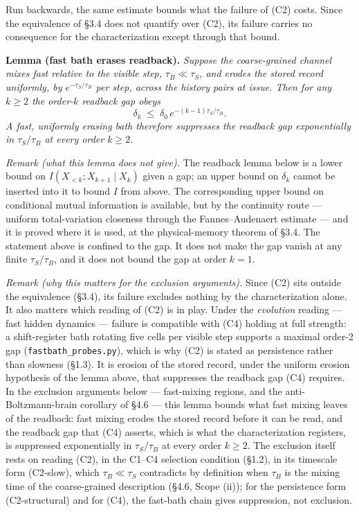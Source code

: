 \documentclass[
]{article}
\begin{document}
Run backwards, the same estimate bounds what the failure of (C2) costs.
Since the equivalence of §3.4 does not quantify over (C2), its failure
carries no consequence for the characterization except through that
bound.

\textbf{Lemma (fast bath erases readback).} \emph{Suppose the
coarse-grained channel mixes fast relative to the visible step,
\(\tau_B \ll \tau_S\), and erodes the stored record uniformly, by
\(e^{-\tau_S/\tau_B}\) per step, across the history pairs at issue. Then
for any \(k \geq 2\) the order-\(k\) readback gap obeys}
\[\delta_k \;\leq\; \delta_0\, e^{-(k-1)\tau_S/\tau_B}.\] \emph{A fast,
uniformly erasing bath therefore suppresses the readback gap
exponentially in \(\tau_S/\tau_B\) at every order \(k \geq 2\).}

\emph{Remark (what this lemma does not give).} The readback lemma below
is a lower bound on \(I(X_{<k}; X_{k+1} \mid X_k)\) given a gap; an
upper bound on \(\delta_k\) cannot be inserted into it to bound \(I\)
from above. The corresponding upper bound on conditional mutual
information is available, but by the continuity route --- uniform
total-variation closeness through the Fannes--Audenaert estimate --- and
it is proved where it is used, at the physical-memory theorem of §3.4.
The statement above is confined to the gap. It does not make the gap
vanish at any finite \(\tau_S/\tau_B\), and it does not bound the gap at
order \(k = 1\).

\emph{Remark (why this matters for the exclusion arguments).} Since (C2)
sits outside the equivalence (§3.4), its failure excludes nothing by the
characterization alone. It also matters which reading of (C2) is in
play. Under the \emph{evolution} reading --- fast hidden dynamics ---
failure is compatible with (C4) holding at full strength: a
shift-register bath rotating five cells per visible step supports a
maximal order-2 gap (\texttt{fastbath\_probes.py}), which is why (C2) is
stated as persistence rather than slowness (§1.3). It is erosion of the
stored record, under the uniform erosion hypothesis of the lemma above,
that suppresses the readback gap (C4) requires. In the exclusion
arguments below --- fast-mixing regions, and the anti-Boltzmann-brain
corollary of §4.6 --- this lemma bounds what fast mixing leaves of the
readback: fast mixing erodes the stored record before it can be read,
and the readback gap that (C4) asserts, which is what the
characterization registers, is suppressed exponentially in
\(\tau_S/\tau_B\) at every order \(k \geq 2\). The exclusion itself
rests on reading (C2), in the C1--C4 selection condition (§1.2), in its
timescale form (C2-slow), which \(\tau_B \ll \tau_S\) contradicts by
definition when \(\tau_B\) is the mixing time of the coarse-grained
description (§4.6, Scope (ii)); for the persistence form (C2-structural)
and for (C4), the fast-bath chain gives suppression, not exclusion.
\end{document}
